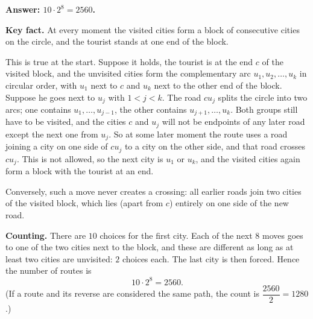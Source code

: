\textbf{Answer: $10\cdot2^8=2560$.}

\textbf{Key fact.} At every moment the visited cities form a block of consecutive cities on the circle, and the tourist stands at one end of the block.

This is true at the start. Suppose it holds, the tourist is at the end $c$ of the visited block, and the unvisited cities form the complementary arc $u_1,u_2,\dots,u_k$ in circular order, with $u_1$ next to $c$ and $u_k$ next to the other end of the block. Suppose he goes next to $u_j$ with $1<j<k$. The road $cu_j$ splits the circle into two arcs; one contains $u_1,\dots,u_{j-1}$, the other contains $u_{j+1},\dots,u_k$. Both groups still have to be visited, and the cities $c$ and $u_j$ will not be endpoints of any later road except the next one from $u_j$. So at some later moment the route uses a road joining a city on one side of $cu_j$ to a city on the other side, and that road crosses $cu_j$. This is not allowed, so the next city is $u_1$ or $u_k$, and the visited cities again form a block with the tourist at an end.

Conversely, such a move never creates a crossing: all earlier roads join two cities of the visited block, which lies (apart from $c$) entirely on one side of the new road.

\textbf{Counting.} There are $10$ choices for the first city. Each of the next $8$ moves goes to one of the two cities next to the block, and these are different as long as at least two cities are unvisited: $2$ choices each. The last city is then forced. Hence the number of routes is
\[
10\cdot2^8=\boxed{2560}.
\]
(If a route and its reverse are considered the same path, the count is $\dfrac{2560}{2}=1280$.)
